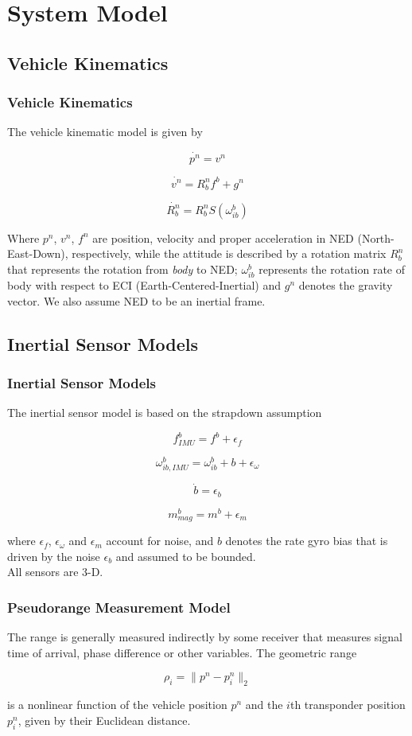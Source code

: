 \documentclass{beamer}
\begin{document}
	
	
	
\section{System Model}
    \subsection{Vehicle Kinematics}
	\begin{frame}
	\frametitle{Vehicle Kinematics}
	The vehicle kinematic model is given by
	
	\[ \dot{p^n} = v^n \]
	
	\[ \dot{v^n} = R^n_b f^b + g^n\]
	
	\[ \dot{R^n_b} = R^n_bS(\omega^b_{ib}) \]
	
	Where $p^n$, $v^n$, $f^n$ are position, velocity and proper acceleration in NED (North-East-Down), respectively, while the attitude is described by a rotation matrix $R^n_b$ that represents the rotation from \textit{body} to NED; $\omega^b_{ib}$ represents the rotation rate of body with respect to ECI (Earth-Centered-Inertial) and $g^n$ denotes the gravity vector. We also assume NED to be an inertial frame. 
	
	\end{frame}
 \subsection{Inertial Sensor Models}	
	\begin{frame}
	\frametitle{Inertial Sensor Models}
	The inertial sensor model is based on the strapdown assumption
	
	\[ f^b_{IMU} = f^b + \epsilon_f\]
	
	\[ \omega^b_{ib,IMU} = \omega^b_{ib} + b + \epsilon_\omega \]
	
	\[ \dot{b} = \epsilon_b \]
	
	\[ m^b_{mag} = m^b + \epsilon_m \]
	
	where $\epsilon_f$, $\epsilon_\omega$ and $\epsilon_m$ account for noise, and $b$ denotes the rate gyro bias that is driven by the noise $\epsilon_b$ and assumed to be bounded.  
	\\ All sensors are 3-D.
	\end{frame}

	\begin{frame}
	\frametitle{Pseudorange Measurement Model}
	The range is generally measured indirectly by some receiver that measures signal time of arrival, phase difference or other variables. The geometric range 
	
	\[ \rho_i = \|p^n - p^n_i\|_2 \]
	
	is a nonlinear function of the vehicle position $p^n$ and the $i$th transponder position $p^n_i$, given by their Euclidean distance.
	\end{frame}
\end{document}
